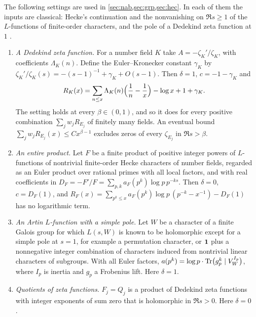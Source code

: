\begin{example}[Instances]\label{ana:ex:instances}
The following settings are used in \cref{sec:nab,sec:grp,sec:hec}. In each of them the inputs
are classical: Hecke's continuation and the nonvanishing on $\Re s\ge1$ of the $L$-functions of
finite-order characters, and the pole of a Dedekind zeta function at $1$
\cite{Neukirch1999Algebraic}.
\begin{enumerate}[label=\textup{(\alph*)}]
\item \emph{A Dedekind zeta function.} For a number field $K$ take $A=-\zeta_K'/\zeta_K$, with
 coefficients $\Lambda_K(n)$. Define the Euler--Kronecker constant $\gamma_K$ by
 $\zeta_K'/\zeta_K(s)=-(s-1)^{-1}+\gamma_K+O(s-1)$. Then $\delta=1$, $c=-1-\gamma_K$ and
 \begin{equation}\label{ana:eq:RK}
  R_K(x)=\sum_{n\le x}\Lambda_K(n)\Bigl(\frac1n-\frac1x\Bigr)-\log x+1+\gamma_K .
 \end{equation}
 The setting holds at every $\beta\in(0,1)$, and so it does for every positive combination
 $\sum_jw_jR_{E_j}$ of finitely many fields. An eventual bound
 $\sum_jw_jR_{E_j}(x)\le Cx^{\beta-1}$ excludes zeros of every $\zeta_{E_j}$ in $\Re s>\beta$.
\item \emph{An entire product.} Let $F$ be a finite product of positive integer powers of
 $L$-functions of nontrivial finite-order Hecke characters of number fields, regarded as an
 Euler product over rational primes with all local factors, and with real coefficients in
 $D_F=-F'/F=\sum_{p,k}a_F(p^k)\log p\,p^{-ks}$. Then $\delta=0$, $c=D_F(1)$, and
 $R_F(x)=\sum_{p^k\le x}a_F(p^k)\log p\,(p^{-k}-x^{-1})-D_F(1)$ has no logarithmic term.
\item \emph{An Artin $L$-function with a simple pole.} Let $W$ be a character of a finite Galois
 group for which $L(s,W)$ is known to be holomorphic except for a simple pole at $s=1$, for
 example a permutation character, or $\mathbf{1}$ plus a nonnegative integer combination of
 characters induced from nontrivial linear characters of subgroups. With all Euler factors,
 $a(p^k)=\log p\cdot\operatorname{Tr}\bigl(g_p^k\mid V_W^{I_p}\bigr)$, where $I_p$ is inertia and $g_p$ a
 Frobenius lift. Here $\delta=1$.
\item \emph{Quotients of zeta functions.} $F_j=Q_j$ is a product of Dedekind zeta functions with
 integer exponents of sum zero that is holomorphic in $\Re s>0$. Here $\delta=0$.
\end{enumerate}
\end{example}

